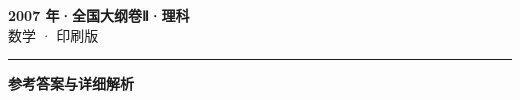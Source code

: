 \documentclass[zihao=5, a4paper]{ctexart}
\begin{document}
\begin{center}
  {\Large\bfseries 2007 年·全国大纲卷Ⅱ·理科}\\[4pt]
  {\large 数学 · 印刷版}
\end{center}
\medskip
{}

\par\bigskip\hrule\bigskip
{}
\begin{center}{\large\bfseries 参考答案与详细解析}\end{center}
\smallskip

\end{document}
